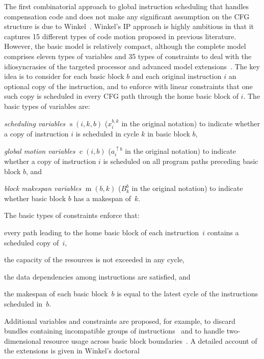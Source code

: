 \documentclass[acmsmall,authorversion,nonacm]{acmart}
\newcommand{\noMathVar}[2]{\operatorname{#1}(#2)}
\newcommand{\var}[2]{$\noMathVar{#1}{#2}$}
\begin{document}
The first combinatorial approach to global instruction scheduling that
handles compensation code and does not make any significant assumption
on the CFG structure is due to Winkel~\cite{Winkel2004,Winkel2007}.
Winkel's IP approach is highly ambitious in that it captures 15
different types of code motion proposed in previous literature.
However, the basic model is relatively compact, although the complete
model comprises eleven types of variables and 35 types of constraints
to deal with the idiosyncrasies of the targeted processor and advanced
model extensions~\cite{Winkel2007}.
The key idea is to consider for each basic block $b$ and each original
instruction $i$ an optional copy of the instruction, and to enforce
with linear constraints that one such copy is scheduled in every CFG
path through the home basic block of $i$.
The basic types of variables are:
\begin{inparaitem}[]
\item \emph{scheduling variables} \var{s}{i,k,b} ($x^{b,k}_i$ in the
  original notation) to indicate whether a copy of instruction $i$ is
  scheduled in cycle $k$ in basic block $b$,
\item \emph{global motion variables} \var{c}{i,b} ($a^{\uparrow b}_i$
  in the original notation) to indicate whether a copy of instruction
  $i$ is scheduled on all program paths preceding basic block $b$, and
\item \emph{block makespan variables} \var{m}{b,k} ($B^b_k$ in the
  original notation) to indicate whether basic block $b$ has a
  makespan of~$k$.
\end{inparaitem}
The basic types of constraints enforce that:
\begin{inparaitem}[]
\item every path leading to the home basic block of each
  instruction~$i$ contains a scheduled copy of~$i$,
\item the capacity of the resources is not exceeded in any cycle,
\item the data dependencies among instructions are satisfied, and
\item the makespan of each basic block~$b$ is equal to the latest
  cycle of the instructions scheduled in~$b$.
\end{inparaitem}
Additional variables and constraints are proposed, for example, to
discard bundles containing incompatible groups of
instructions~\cite{Winkel2004} and to handle two-dimensional resource
usage across basic block boundaries~\cite{Winkel2007}.
A detailed account of the extensions is given in Winkel's doctoral
\end{document}
